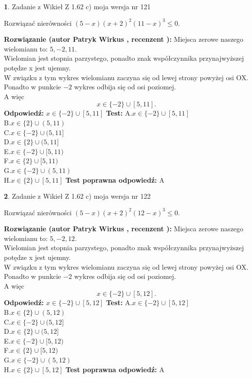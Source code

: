 \documentclass[12pt, a4paper]{article}
\theoremstyle{definition} %
\newtheorem{zad}{}
\newcommand{\zadStart}[1]{\begin{zad}#1\newline}
\newcommand{\zadStop}{\end{zad}}
\newcommand{\rozwStart}[2]{\noindent \textbf{Rozwiązanie (autor #1 , recenzent #2): }\newline}
\newcommand{\rozwStop}{\newline}
\newcommand{\odpStart}{\noindent \textbf{Odpowiedź:}\newline}
\newcommand{\odpStop}{\newline}
\newcommand{\testStart}{\noindent \textbf{Test:}\newline}
\newcommand{\testStop}{\newline}
\newcommand{\kluczStart}{\noindent \textbf{Test poprawna odpowiedź:}\newline}
\newcommand{\kluczStop}{\newline}
\begin{document}
\zadStart{Zadanie z Wikieł Z 1.62 c) moja wersja nr 121}

Rozwiązać nierówności $(5-x)(x+2)^{2}(11-x)^{3}\le0$.
\zadStop
\rozwStart{Patryk Wirkus}{}
Miejsca zerowe naszego wielomianu to: $5, -2, 11$.\\
Wielomian jest stopnia parzystego, ponadto znak współczynnika przy\linebreak najwyższej potędze x jest ujemny.\\ W związku z tym wykres wielomianu zaczyna się od lewej strony powyżej osi OX.\\
Ponadto w punkcie $-2$ wykres odbija się od osi poziomej.\\
A więc $$x \in \{-2\} \cup [5,11].$$
\rozwStop
\odpStart
$x \in \{-2\} \cup [5,11]$
\odpStop
\testStart
A.$x \in \{-2\} \cup [5,11]$\\
B.$x \in \{2\} \cup (5,11)$\\
C.$x \in \{-2\} \cup (5,11]$\\
D.$x \in \{2\} \cup (5,11]$\\
E.$x \in \{-2\} \cup [5,11)$\\
F.$x \in \{2\} \cup [5,11)$\\
G.$x \in \{-2\} \cup (5,11)$\\
H.$x \in \{2\} \cup [5,11]$
\testStop
\kluczStart
A
\kluczStop



\zadStart{Zadanie z Wikieł Z 1.62 c) moja wersja nr 122}

Rozwiązać nierówności $(5-x)(x+2)^{2}(12-x)^{3}\le0$.
\zadStop
\rozwStart{Patryk Wirkus}{}
Miejsca zerowe naszego wielomianu to: $5, -2, 12$.\\
Wielomian jest stopnia parzystego, ponadto znak współczynnika przy\linebreak najwyższej potędze x jest ujemny.\\ W związku z tym wykres wielomianu zaczyna się od lewej strony powyżej osi OX.\\
Ponadto w punkcie $-2$ wykres odbija się od osi poziomej.\\
A więc $$x \in \{-2\} \cup [5,12].$$
\rozwStop
\odpStart
$x \in \{-2\} \cup [5,12]$
\odpStop
\testStart
A.$x \in \{-2\} \cup [5,12]$\\
B.$x \in \{2\} \cup (5,12)$\\
C.$x \in \{-2\} \cup (5,12]$\\
D.$x \in \{2\} \cup (5,12]$\\
E.$x \in \{-2\} \cup [5,12)$\\
F.$x \in \{2\} \cup [5,12)$\\
G.$x \in \{-2\} \cup (5,12)$\\
H.$x \in \{2\} \cup [5,12]$
\testStop
\kluczStart
A
\kluczStop
\end{document}
